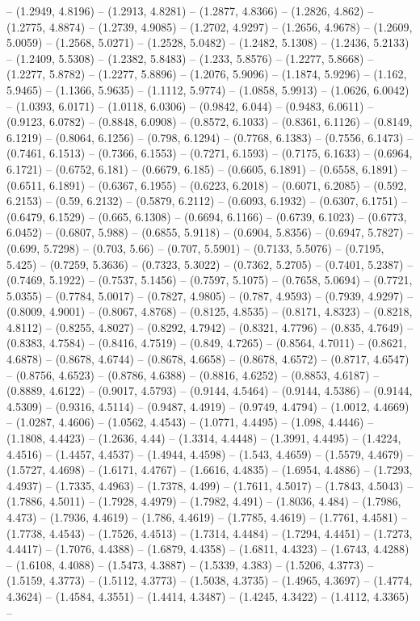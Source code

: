 -- (1.2949, 4.8196) -- (1.2913, 4.8281) -- (1.2877, 4.8366) -- (1.2826, 4.862) -- (1.2775, 4.8874) -- (1.2739, 4.9085) -- (1.2702, 4.9297) -- (1.2656, 4.9678) -- (1.2609, 5.0059) -- (1.2568, 5.0271) -- (1.2528, 5.0482) -- (1.2482, 5.1308) -- (1.2436, 5.2133) -- (1.2409, 5.5308) -- (1.2382, 5.8483) -- (1.233, 5.8576) -- (1.2277, 5.8668) -- (1.2277, 5.8782) -- (1.2277, 5.8896) -- (1.2076, 5.9096) -- (1.1874, 5.9296) -- (1.162, 5.9465) -- (1.1366, 5.9635) -- (1.1112, 5.9774) -- (1.0858, 5.9913) -- (1.0626, 6.0042) -- (1.0393, 6.0171) -- (1.0118, 6.0306) -- (0.9842, 6.044) -- (0.9483, 6.0611) -- (0.9123, 6.0782) -- (0.8848, 6.0908) -- (0.8572, 6.1033) -- (0.8361, 6.1126) -- (0.8149, 6.1219) -- (0.8064, 6.1256) -- (0.798, 6.1294) -- (0.7768, 6.1383) -- (0.7556, 6.1473) -- (0.7461, 6.1513) -- (0.7366, 6.1553) -- (0.7271, 6.1593) -- (0.7175, 6.1633) -- (0.6964, 6.1721) -- (0.6752, 6.181) -- (0.6679, 6.185) -- (0.6605, 6.1891) -- (0.6558, 6.1891) -- (0.6511, 6.1891) -- (0.6367, 6.1955) -- (0.6223, 6.2018) -- (0.6071, 6.2085) -- (0.592, 6.2153) -- (0.59, 6.2132) -- (0.5879, 6.2112) -- (0.6093, 6.1932) -- (0.6307, 6.1751) -- (0.6479, 6.1529) -- (0.665, 6.1308) -- (0.6694, 6.1166) -- (0.6739, 6.1023) -- (0.6773, 6.0452) -- (0.6807, 5.988) -- (0.6855, 5.9118) -- (0.6904, 5.8356) -- (0.6947, 5.7827) -- (0.699, 5.7298) -- (0.703, 5.66) -- (0.707, 5.5901) -- (0.7133, 5.5076) -- (0.7195, 5.425) -- (0.7259, 5.3636) -- (0.7323, 5.3022) -- (0.7362, 5.2705) -- (0.7401, 5.2387) -- (0.7469, 5.1922) -- (0.7537, 5.1456) -- (0.7597, 5.1075) -- (0.7658, 5.0694) -- (0.7721, 5.0355) -- (0.7784, 5.0017) -- (0.7827, 4.9805) -- (0.787, 4.9593) -- (0.7939, 4.9297) -- (0.8009, 4.9001) -- (0.8067, 4.8768) -- (0.8125, 4.8535) -- (0.8171, 4.8323) -- (0.8218, 4.8112) -- (0.8255, 4.8027) -- (0.8292, 4.7942) -- (0.8321, 4.7796) -- (0.835, 4.7649) -- (0.8383, 4.7584) -- (0.8416, 4.7519) -- (0.849, 4.7265) -- (0.8564, 4.7011) -- (0.8621, 4.6878) -- (0.8678, 4.6744) -- (0.8678, 4.6658) -- (0.8678, 4.6572) -- (0.8717, 4.6547) -- (0.8756, 4.6523) -- (0.8786, 4.6388) -- (0.8816, 4.6252) -- (0.8853, 4.6187) -- (0.8889, 4.6122) -- (0.9017, 4.5793) -- (0.9144, 4.5464) -- (0.9144, 4.5386) -- (0.9144, 4.5309) -- (0.9316, 4.5114) -- (0.9487, 4.4919) -- (0.9749, 4.4794) -- (1.0012, 4.4669) -- (1.0287, 4.4606) -- (1.0562, 4.4543) -- (1.0771, 4.4495) -- (1.098, 4.4446) -- (1.1808, 4.4423) -- (1.2636, 4.44) -- (1.3314, 4.4448) -- (1.3991, 4.4495) -- (1.4224, 4.4516) -- (1.4457, 4.4537) -- (1.4944, 4.4598) -- (1.543, 4.4659) -- (1.5579, 4.4679) -- (1.5727, 4.4698) -- (1.6171, 4.4767) -- (1.6616, 4.4835) -- (1.6954, 4.4886) -- (1.7293, 4.4937) -- (1.7335, 4.4963) -- (1.7378, 4.499) -- (1.7611, 4.5017) -- (1.7843, 4.5043) -- (1.7886, 4.5011) -- (1.7928, 4.4979) -- (1.7982, 4.491) -- (1.8036, 4.484) -- (1.7986, 4.473) -- (1.7936, 4.4619) -- (1.786, 4.4619) -- (1.7785, 4.4619) -- (1.7761, 4.4581) -- (1.7738, 4.4543) -- (1.7526, 4.4513) -- (1.7314, 4.4484) -- (1.7294, 4.4451) -- (1.7273, 4.4417) -- (1.7076, 4.4388) -- (1.6879, 4.4358) -- (1.6811, 4.4323) -- (1.6743, 4.4288) -- (1.6108, 4.4088) -- (1.5473, 4.3887) -- (1.5339, 4.383) -- (1.5206, 4.3773) -- (1.5159, 4.3773) -- (1.5112, 4.3773) -- (1.5038, 4.3735) -- (1.4965, 4.3697) -- (1.4774, 4.3624) -- (1.4584, 4.3551) -- (1.4414, 4.3487) -- (1.4245, 4.3422) -- (1.4112, 4.3365) -- 